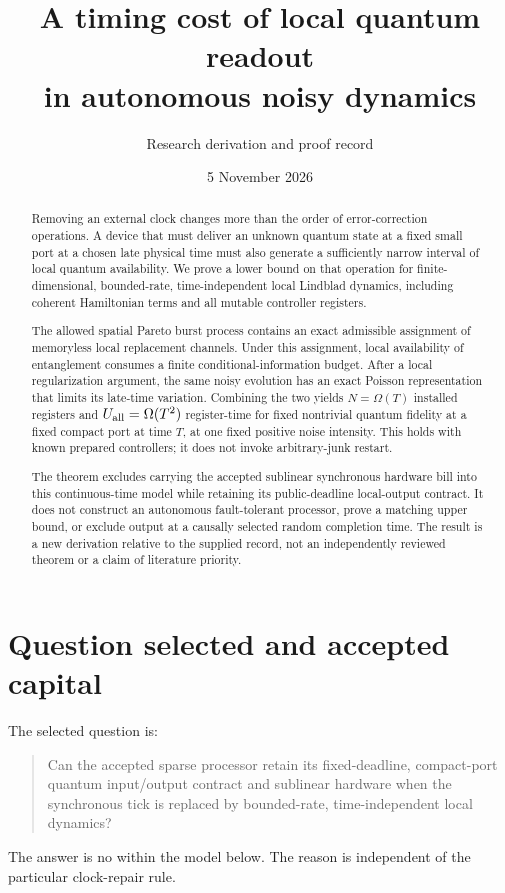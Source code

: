\documentclass[11pt]{article}
\title{A timing cost of local quantum readout\\in autonomous noisy dynamics}
\author{Research derivation and proof record}
\date{5 November 2026}
\begin{document}
\maketitle

\begin{abstract}
Removing an external clock changes more than the order of error-correction
operations. A device that must deliver an unknown quantum state at a fixed
small port at a chosen late physical time must also generate a sufficiently
narrow interval of local quantum availability. We prove a lower bound on
that operation for finite-dimensional, bounded-rate, time-independent local
Lindblad dynamics, including coherent Hamiltonian terms and all mutable
controller registers.

The allowed spatial Pareto burst process contains an exact admissible
assignment of memoryless local replacement channels. Under this assignment,
local availability of entanglement consumes a finite conditional-information
budget. After a local regularization argument, the same noisy evolution has
an exact Poisson representation that limits its late-time variation.
Combining the two yields \(N=\Omega(T)\) installed registers and
\(U_{\rm all}=\Omega(T^2)\) register-time for fixed nontrivial quantum fidelity
at a fixed compact port at time \(T\), at one fixed positive noise intensity.
This holds with known prepared controllers; it does not invoke arbitrary-junk
restart.

The theorem excludes carrying the accepted sublinear synchronous hardware
bill into this continuous-time model while retaining its public-deadline
local-output contract. It does not construct an autonomous fault-tolerant
processor, prove a matching upper bound, or exclude output at a causally
selected random completion time. The result is a new derivation relative to
the supplied record, not an independently reviewed theorem or a claim of
literature priority.
\end{abstract}

\section{Question selected and accepted capital}

The selected question is:
\begin{quote}
Can the accepted sparse processor retain its fixed-deadline, compact-port
quantum input/output contract and sublinear hardware when the synchronous
tick is replaced by bounded-rate, time-independent local dynamics?
\end{quote}
The answer is no within the model below. The reason is independent of the
particular clock-repair rule.
\end{document}
